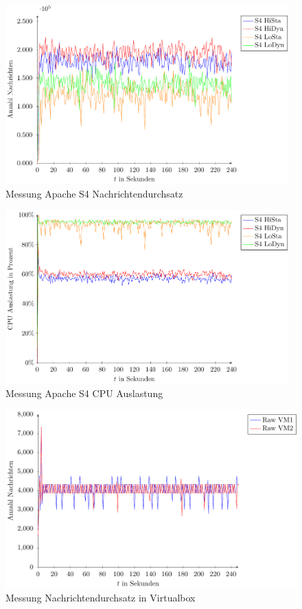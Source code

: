 \begin{figure}
\includegraphics[width=0.97\textwidth]{plots/messungS4Durchsatz.pdf}
\caption{Messung Apache S4 Nachrichtendurchsatz
\label{fig:messungS4Nd}}
\end{figure}
\begin{figure}
\includegraphics[width=0.97\textwidth]{plots/messungS4Cpu.pdf}
\caption{Messung Apache S4 CPU Auslastung
\label{fig:messungS4Cpu}}
\end{figure}



\begin{figure}
\includegraphics[width=1.0\textwidth]{plots/virtualBoxRaw.pdf}
\caption{Messung Nachrichtendurchsatz in Virtualbox
\label{fig:messungMaxNachrichten}}
\end{figure}


